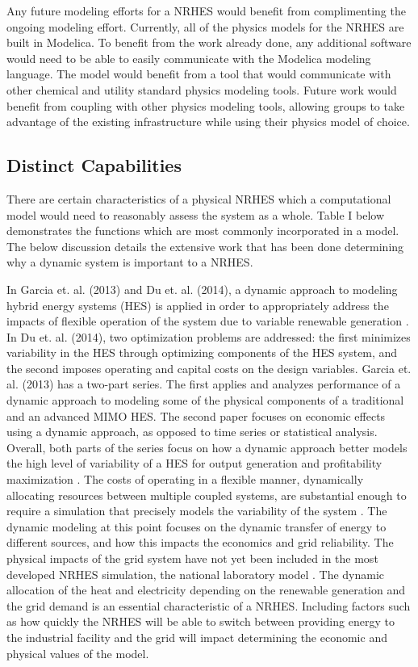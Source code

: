 \documentclass[12pt]{UIdahoMastersThesis}
\begin{document}
Any future modeling efforts for a NRHES would benefit from complimenting the ongoing modeling effort. Currently, all of the physics models for the NRHES are built in Modelica. To benefit from the work already done, any additional software would need to be able to easily communicate with the Modelica modeling language.  The model would benefit from a tool that would communicate with other chemical and utility standard physics modeling tools. Future work would benefit from coupling with other physics modeling tools, allowing groups to take advantage of the existing infrastructure while using their physics model of choice. 

\subsection{Distinct Capabilities}
There are certain characteristics of a physical NRHES which a computational model would need to reasonably assess the system as a whole. Table I below demonstrates the functions which are most commonly incorporated in a model. The below discussion details the extensive work that has been done determining why a dynamic system is important to a NRHES. 

In Garcia et. al. (2013) and Du et. al. (2014), a dynamic approach to modeling hybrid energy systems (HES) is applied in order to appropriately address the impacts of flexible operation of the system due to variable renewable generation \cite{Garcia2013, Du2014}. In Du et. al. (2014), two optimization problems are addressed: the first minimizes variability in the HES through optimizing components of the HES system, and the second imposes operating and capital costs on the design variables. Garcia et. al. (2013) has a two-part series. The first applies and analyzes performance of a dynamic approach to modeling some of the physical components of a traditional and an advanced MIMO HES. The second paper focuses on economic effects using a dynamic approach, as opposed to time series or statistical analysis. Overall, both parts of the series focus on how a dynamic approach better models the high level of variability of a HES for output generation and profitability maximization \cite{Garcia2013}. The costs of operating in a flexible manner, dynamically allocating resources between multiple coupled systems, are substantial enough to require a simulation that precisely models the variability of the system \cite{Garcia2013, Shropshire2011, Locatelli2015}. The dynamic modeling at this point focuses on the dynamic transfer of energy to different sources, and how this impacts the economics and grid reliability. The physical impacts of the grid system have not yet been included in the most developed NRHES simulation, the national laboratory model \cite{Harrison2016}.  The dynamic allocation of the heat and electricity depending on the renewable generation and the grid demand is an essential characteristic of a NRHES.  Including factors such as how quickly the NRHES will be able to switch between providing energy to the industrial facility and the grid will impact determining the economic and physical values of the model.
\end{document}
